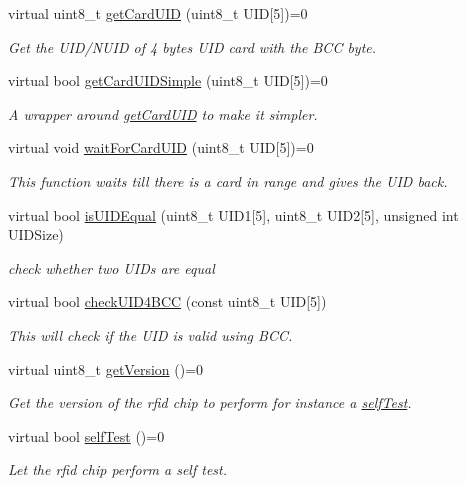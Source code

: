 \begin{DoxyCompactItemize}
virtual uint8\+\_\+t \mbox{\hyperlink{classrfid_afeb2a321694ceaf84db793f5efb3a750}{get\+Card\+U\+ID}} (uint8\+\_\+t U\+ID\mbox{[}5\mbox{]})=0
\begin{DoxyCompactList}\small\item\em Get the U\+I\+D/\+N\+U\+ID of 4 bytes U\+ID card with the B\+CC byte. \end{DoxyCompactList}\item 
virtual bool \mbox{\hyperlink{classrfid_aaeb826495120d8d29683f0ea1b985d77}{get\+Card\+U\+I\+D\+Simple}} (uint8\+\_\+t U\+ID\mbox{[}5\mbox{]})=0
\begin{DoxyCompactList}\small\item\em A wrapper around \mbox{\hyperlink{classrfid_afeb2a321694ceaf84db793f5efb3a750}{get\+Card\+U\+ID}} to make it simpler. \end{DoxyCompactList}\item 
virtual void \mbox{\hyperlink{classrfid_a1b324cb1e7b4c377eca4b3495d4189fd}{wait\+For\+Card\+U\+ID}} (uint8\+\_\+t U\+ID\mbox{[}5\mbox{]})=0
\begin{DoxyCompactList}\small\item\em This function waits till there is a card in range and gives the U\+ID back. \end{DoxyCompactList}\item 
virtual bool \mbox{\hyperlink{classrfid_a8c239b8e42f20d4310c44368bd5030a7}{is\+U\+I\+D\+Equal}} (uint8\+\_\+t U\+I\+D1\mbox{[}5\mbox{]}, uint8\+\_\+t U\+I\+D2\mbox{[}5\mbox{]}, unsigned int U\+I\+D\+Size)
\begin{DoxyCompactList}\small\item\em check whether two U\+I\+Ds are equal \end{DoxyCompactList}\item 
virtual bool \mbox{\hyperlink{classrfid_a4ca2918b2b7011a6eb685ea547c21826}{check\+U\+I\+D4\+B\+CC}} (const uint8\+\_\+t U\+ID\mbox{[}5\mbox{]})
\begin{DoxyCompactList}\small\item\em This will check if the U\+ID is valid using B\+CC. \end{DoxyCompactList}\item 
virtual uint8\+\_\+t \mbox{\hyperlink{classrfid_a27619628e718bb781f912aead770079a}{get\+Version}} ()=0
\begin{DoxyCompactList}\small\item\em Get the version of the rfid chip to perform for instance a \mbox{\hyperlink{classrfid_a93e5430380a14fd652e7ca1ce6443198}{self\+Test}}. \end{DoxyCompactList}\item 
virtual bool \mbox{\hyperlink{classrfid_a93e5430380a14fd652e7ca1ce6443198}{self\+Test}} ()=0
\begin{DoxyCompactList}\small\item\em Let the rfid chip perform a self test. \end{DoxyCompactList}\end{DoxyCompactItemize}
